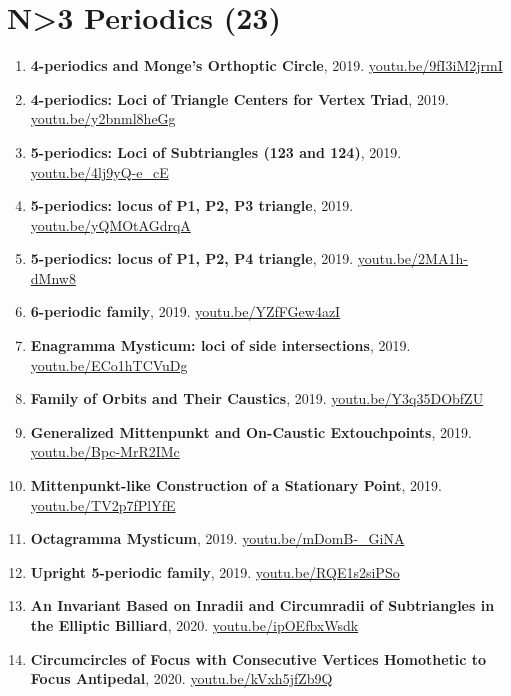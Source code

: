 \documentclass[12pt]{article}
\begin{document}
\section{N>3 Periodics (23)}

\begin{enumerate}[resume]
\item \textbf{4-periodics and Monge's Orthoptic Circle}, 2019. \href{https://youtu.be/9fI3iM2jrmI}{\url{youtu.be/9fI3iM2jrmI}}
\item \textbf{4-periodics: Loci of Triangle Centers for Vertex Triad}, 2019. \href{https://youtu.be/y2bnml8heGg}{\url{youtu.be/y2bnml8heGg}}
\item \textbf{5-periodics: Loci of Subtriangles (123 and 124)}, 2019. \href{https://youtu.be/4lj9yQ-e_cE}{\url{youtu.be/4lj9yQ-e\_cE}}
\item \textbf{5-periodics: locus of P1, P2, P3 triangle}, 2019. \href{https://youtu.be/yQMOtAGdrqA}{\url{youtu.be/yQMOtAGdrqA}}
\item \textbf{5-periodics: locus of P1, P2, P4 triangle}, 2019. \href{https://youtu.be/2MA1h-dMnw8}{\url{youtu.be/2MA1h-dMnw8}}
\item \textbf{6-periodic family}, 2019. \href{https://youtu.be/YZfFGew4azI}{\url{youtu.be/YZfFGew4azI}}
\item \textbf{Enagramma Mysticum: loci of side intersections}, 2019. \href{https://youtu.be/ECo1hTCVuDg}{\url{youtu.be/ECo1hTCVuDg}}
\item \textbf{Family of Orbits and Their Caustics}, 2019. \href{https://youtu.be/Y3q35DObfZU}{\url{youtu.be/Y3q35DObfZU}}
\item \textbf{Generalized Mittenpunkt and On-Caustic Extouchpoints}, 2019. \href{https://youtu.be/Bpc-MrR2IMc}{\url{youtu.be/Bpc-MrR2IMc}}
\item \textbf{Mittenpunkt-like Construction of a Stationary Point}, 2019. \href{https://youtu.be/TV2p7fPlYfE}{\url{youtu.be/TV2p7fPlYfE}}
\item \textbf{Octagramma Mysticum}, 2019. \href{https://youtu.be/mDomB-_GiNA}{\url{youtu.be/mDomB-\_GiNA}}
\item \textbf{Upright 5-periodic family}, 2019. \href{https://youtu.be/RQE1s2siPSo}{\url{youtu.be/RQE1s2siPSo}}
\item \textbf{An Invariant Based on Inradii and Circumradii of Subtriangles in the Elliptic Billiard}, 2020. \href{https://youtu.be/ipOEfbxWsdk}{\url{youtu.be/ipOEfbxWsdk}}
\item \textbf{Circumcircles of Focus with Consecutive Vertices Homothetic to Focus Antipedal}, 2020. \href{https://youtu.be/kVxh5jfZb9Q}{\url{youtu.be/kVxh5jfZb9Q}}

\end{enumerate}
\end{document}
